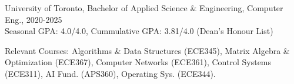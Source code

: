 University of Toronto, Bachelor of Applied Science \& Engineering, Computer Eng., 2020-2025 \\
Seasonal GPA: 4.0/4.0, Cummulative GPA: 3.81/4.0 (Dean’s Honour List) \\
\raggedright{Relevant Courses: Algorithms \& Data Structures (ECE345), Matrix Algebra \& Optimization (ECE367), 
Computer Networks (ECE361), Control Systems (ECE311), AI Fund. (APS360), Operating Sys. (ECE344).} \\[10pt]
